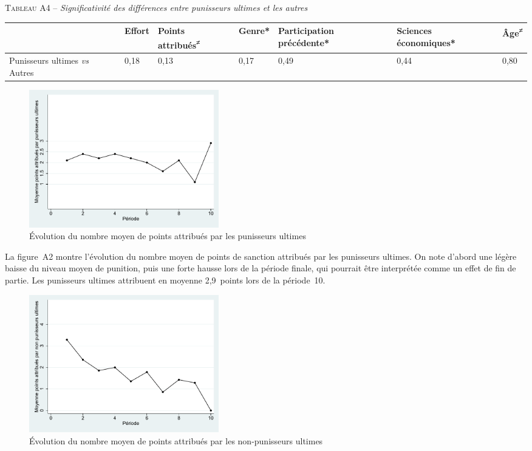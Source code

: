 \begin{Article}
\begin{refsection}[Lebourges]
\begin{appendices}
\vspace{0.2cm}
{\centering \textsc{Tableau A4} -- \emph{Significativité des différences entre punisseurs ultimes et les autres}\par}
\begin{table}[h!]
\label{tab_A4}
\centering
\begin{tabular}{m{2.2cm}D{0.5cm}D{1.1cm}D{0.75cm}D{1.4cm}D{1.6cm}D{0.6cm}}
\toprule
& Effort & Points attribués\textsuperscript{≠} & Genre* & Participation précédente* & Sciences économiques* & Âge\textsuperscript{≠} \tabularnewline
\midrule
Punisseurs ultimes \emph{vs} Autres & 0,18 & 0,13 & 0,17 & 0,49 & 0,44 & 0,80 \tabularnewline
\bottomrule
\end{tabular}
\end{table}

\begin{figure}[h]
    \centering
    \caption{Évolution du nombre moyen de points attribués par les punisseurs ultimes}
    \includegraphics[height=6cm]{05_graphA2.pdf}
\end{figure}

La figure~A2 montre l'évolution du nombre moyen de points de sanction
attribués par les punisseurs ultimes. On note d'abord une légère baisse
du niveau moyen de punition, puis une forte hausse lors de la période
finale, qui pourrait être interprétée comme un effet de fin de partie.
Les punisseurs ultimes attribuent en moyenne 2,9~points lors de la
période~10.

\begin{figure}[h]
    \centering
    \caption{Évolution du nombre moyen de points attribués par les non-punisseurs ultimes}
    \includegraphics[height=6cm]{05_graphA3.pdf}
\end{figure}


\end{appendices}
\end{refsection}
\end{Article}
